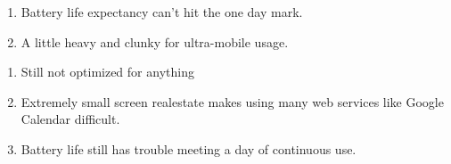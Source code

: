 \documentclass[letterpaper]{article}
\begin{document}
{\begin{enumerate}
\end{enumerate}


\begin{enumerate}

\item Battery life expectancy can't hit the one day mark.

\item A little heavy and clunky for ultra-mobile usage.

\end{enumerate}

\newpage


\begin{enumerate}

\item Still not optimized for anything

\item Extremely small screen realestate makes using many web services like
  Google Calendar difficult.

\item Battery life still has trouble meeting a day of continuous use.

\end{enumerate}

}
\end{document}
